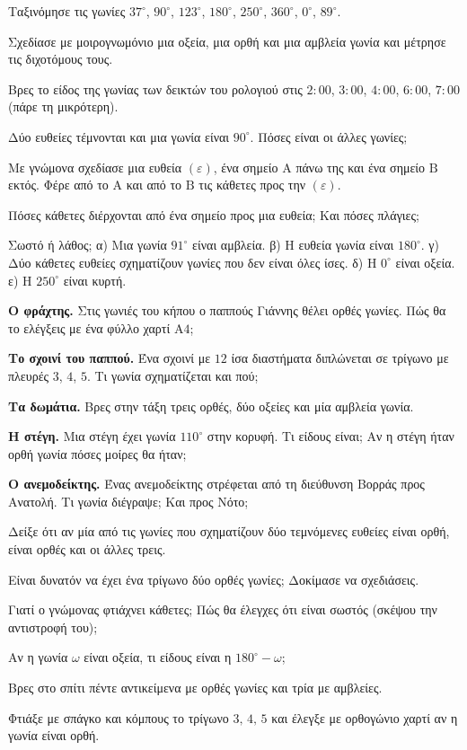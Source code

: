 \ex Ταξινόμησε τις γωνίες $37^\circ$, $90^\circ$, $123^\circ$, $180^\circ$, $250^\circ$, $360^\circ$, $0^\circ$, $89^\circ$.

\ex Σχεδίασε με μοιρογνωμόνιο μια οξεία, μια ορθή και μια αμβλεία γωνία και μέτρησε τις διχοτόμους τους.

\ex Βρες το είδος της γωνίας των δεικτών του ρολογιού στις $2{:}00$, $3{:}00$, $4{:}00$, $6{:}00$, $7{:}00$ (πάρε τη μικρότερη).

\ex Δύο ευθείες τέμνονται και μια γωνία είναι $90^\circ$. Πόσες είναι οι άλλες γωνίες;

\ex Με γνώμονα σχεδίασε μια ευθεία $(\varepsilon)$, ένα σημείο $\mathrm{Α}$ πάνω της και ένα σημείο $\mathrm{Β}$ εκτός. Φέρε από το $\mathrm{Α}$ και από το $\mathrm{Β}$ τις κάθετες προς την $(\varepsilon)$.

\ex Πόσες κάθετες διέρχονται από ένα σημείο προς μια ευθεία; Και πόσες πλάγιες;

\ex Σωστό ή λάθος; α) Μια γωνία $91^\circ$ είναι αμβλεία. \quad β) Η ευθεία γωνία είναι $180^\circ$. \quad γ) Δύο κάθετες ευθείες σχηματίζουν γωνίες που δεν είναι όλες ίσες. \quad δ) Η $0^\circ$ είναι οξεία. \quad ε) Η $250^\circ$ είναι κυρτή.


\ex \textbf{Ο φράχτης.} Στις γωνιές του κήπου ο παππούς Γιάννης θέλει ορθές γωνίες. Πώς θα το ελέγξεις με ένα φύλλο χαρτί $\mathrm{Α4}$;

\ex \textbf{Το σχοινί του παππού.} Ένα σχοινί με $12$ ίσα διαστήματα διπλώνεται σε τρίγωνο με πλευρές $3$, $4$, $5$. Τι γωνία σχηματίζεται και πού;

\ex \textbf{Τα δωμάτια.} Βρες στην τάξη τρεις ορθές, δύο οξείες και μία αμβλεία γωνία.

\ex \textbf{Η στέγη.} Μια στέγη έχει γωνία $110^\circ$ στην κορυφή. Τι είδους είναι; Αν η στέγη ήταν ορθή γωνία πόσες μοίρες θα ήταν;

\ex \textbf{Ο ανεμοδείκτης.} Ένας ανεμοδείκτης στρέφεται από τη διεύθυνση Βορράς προς Ανατολή. Τι γωνία διέγραψε; Και προς Νότο;


\ex Δείξε ότι αν μία από τις γωνίες που σχηματίζουν δύο τεμνόμενες ευθείες είναι ορθή, είναι ορθές και οι άλλες τρεις.

\ex Είναι δυνατόν να έχει ένα τρίγωνο δύο ορθές γωνίες; Δοκίμασε να σχεδιάσεις.

\ex Γιατί ο γνώμονας φτιάχνει κάθετες; Πώς θα έλεγχες ότι είναι σωστός (σκέψου την αντιστροφή του);

\ex Αν η γωνία $\omega$ είναι οξεία, τι είδους είναι η $180^\circ-\omega$;


\ex Βρες στο σπίτι πέντε αντικείμενα με ορθές γωνίες και τρία με αμβλείες.

\ex Φτιάξε με σπάγκο και κόμπους το τρίγωνο $3,\,4,\,5$ και έλεγξε με ορθογώνιο χαρτί αν η γωνία είναι ορθή.
